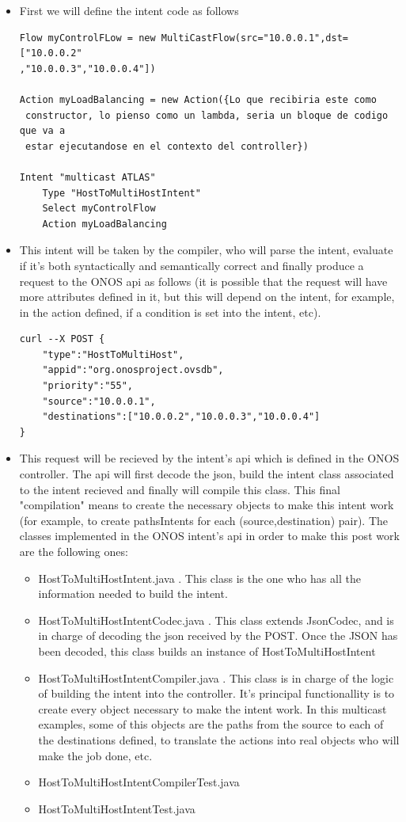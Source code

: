 \documentclass[envcountsect,runningheads]{llncs}
\begin{document}
\begin{itemize}
	\item First we will define the intent code as follows
	\begin{lstlisting}
Flow myControlFLow = new MultiCastFlow(src="10.0.0.1",dst=["10.0.0.2"
,"10.0.0.3","10.0.0.4"])

Action myLoadBalancing = new Action({Lo que recibiria este como
 constructor, lo pienso como un lambda, seria un bloque de codigo que va a 
 estar ejecutandose en el contexto del controller})

Intent "multicast ATLAS" 
	Type "HostToMultiHostIntent" 
	Select myControlFlow 
	Action myLoadBalancing 
\end{lstlisting}

\item This intent will be taken by the compiler, who will parse the intent, evaluate if it's both syntactically and semantically correct and finally produce a request to the ONOS api as follows (it is possible that the request will have more attributes defined in it, but this will depend on the intent, for example, in the action defined, if a condition is set into the intent, etc).
\begin{lstlisting}
curl --X POST { 
	"type":"HostToMultiHost",
	"appid":"org.onosproject.ovsdb",
	"priority":"55",
	"source":"10.0.0.1",
	"destinations":["10.0.0.2","10.0.0.3","10.0.0.4"]
} 
\end{lstlisting}

\item This request will be recieved by the intent's api which is defined in the ONOS controller. The api will first decode the json, build the intent class associated to the intent recieved and finally will compile this class. This final "compilation" means to create the necessary objects to make this intent work (for example, to create pathsIntents for each (source,destination) pair). The classes implemented in the ONOS intent's api in order to make this post work are the following ones:
	\begin{itemize}
	\item HostToMultiHostIntent.java . This class is the one who has all the information needed to build the intent.
	\item HostToMultiHostIntentCodec.java . This class extends JsonCodec, and is in charge of decoding the json received by the POST. Once the JSON has been decoded, this class builds an instance of HostToMultiHostIntent
	\item HostToMultiHostIntentCompiler.java . This class is in charge of the logic of building the intent into the controller. It's principal functionallity is to create every object necessary to make the intent work. In this multicast examples, some of this objects are the paths from the source to each of the destinations defined, to translate the actions into real objects who will make the job done, etc.
	\item HostToMultiHostIntentCompilerTest.java
	\item HostToMultiHostIntentTest.java
	\end{itemize}


\end{itemize}
\end{document}
